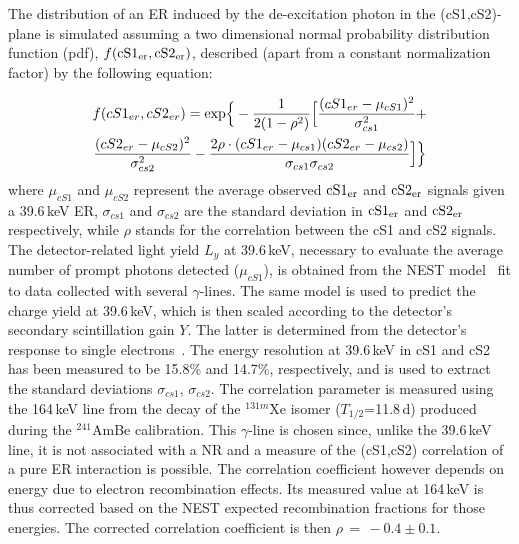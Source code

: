 The distribution of an ER induced by the de-excitation photon in the (cS1,cS2)-plane  is simulated assuming a two dimensional normal probability distribution function (pdf), $f(\rm{cS1}_{er},\rm{cS2}_{er})$, 
described (apart from a constant normalization factor) by the following equation:

\begin{multline}
	f(cS1_{er},cS2_{er})  = {\rm exp} \Big\{ -\frac{1}{2(1-\rho^2)} \Big[ \frac{(cS1_{er} - \mu_{cS1})^2}{\sigma_{cs1}^2} + \\ 
	 \frac{(cS2_{er} - \mu_{cS2})^2}{\sigma_{cs2}^2} - \frac{2\rho\cdot(cS1_{er} - \mu_{cs1}) (cS2_{er} - \mu_{cs2})} {\sigma_{cs1}\sigma_{cs2}} \Big] \Big\}
\label{f:2dgaus}
\end{multline}
where $\mu_{cS1}$ and $\mu_{cS2}$ 
represent the average observed $\rm{cS1_{er}}$ and $\rm{cS2_{er}}$ signals given a 39.6\,keV ER, $\sigma_{cs1}$ and $\sigma_{cs2}$ are the standard deviation in $\rm{cS1_{er}}$ and $\rm{cS2_{er}}$ respectively,
while $\rho$ stands for the correlation between the cS1 and cS2 signals. The detector-related light yield $L_y$  at 39.6\,keV, necessary to evaluate the average number of prompt photons detected 
($\mu_{cS1}$), is obtained from the NEST model~\cite{NEST,Geant1,Geant2} fit to data collected with several $\gamma$-lines.
The same model is used to predict the charge yield at 39.6\,keV, which is then scaled according to the detector's secondary scintillation gain $Y$. 
 The latter is determined from the detector's response to single electrons~\cite{SingleE}.
The energy resolution at 39.6\,keV in cS1 and cS2 has been measured to be 15.8\% and 14.7\%, respectively, and is used to extract the standard 
deviations $\sigma_{cs1}$, $\sigma_{cs2}$.  The correlation parameter is measured
using the 164\,keV line from the decay of the $^{131m}$Xe isomer ($T_{1/2}$=11.8\,d) produced during the  $^{241}$AmBe calibration. This $\gamma$-line is chosen since, unlike the 39.6\,keV line, 
it is not associated with a NR and a measure of the (cS1,cS2) correlation of a pure ER interaction is possible. The correlation coefficient however depends on energy due to 
electron recombination effects. Its measured value at 164\,keV is thus corrected based on the NEST expected recombination fractions for those energies. 
The corrected correlation coefficient is then $\rho \, = \, -0.4 \pm 0.1$. 



